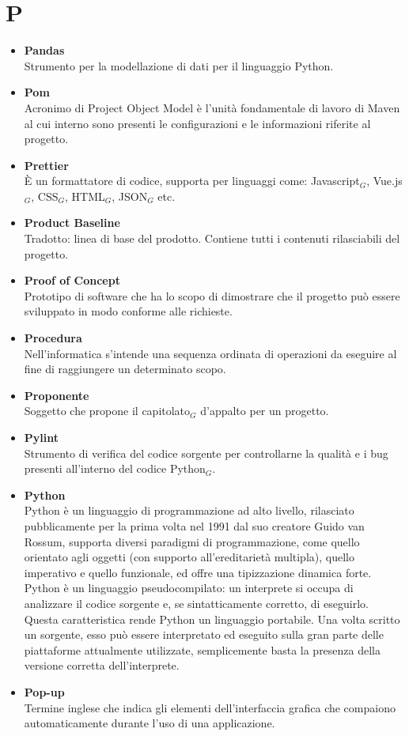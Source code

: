 \chapter{P} \label{P}
	\begin{itemize}
		\item \textbf{Pandas}\\
		Strumento per la modellazione di dati per il linguaggio Python.
		\item \textbf{Pom}\\
		Acronimo di Project Object Model è l'unità fondamentale di lavoro di Maven al cui interno sono presenti le configurazioni e le informazioni riferite al progetto.
		
		\item \textbf{Prettier} \\
		È un formattatore di codice, supporta per linguaggi come: Javascript$_G$, Vue.js$_G$, CSS$_G$, HTML$_G$, JSON$_G$ etc.

		\item \textbf{Product Baseline}\\
		Tradotto: linea di base del prodotto.
		Contiene tutti i contenuti rilasciabili del progetto.

		\item \textbf{Proof of Concept}\\
		Prototipo di software che ha lo scopo di dimostrare che il progetto può essere sviluppato in modo conforme alle richieste.

		\item \textbf{Procedura}\\
		Nell'informatica s'intende una sequenza ordinata di operazioni da eseguire al fine di raggiungere un determinato scopo.

		\item \textbf{Proponente}\\
		Soggetto che propone il capitolato$_G$ d'appalto per un progetto.

		\item \textbf{Pylint} \\
		Strumento di verifica del codice sorgente per controllarne la qualità e i bug presenti all'interno del codice Python$_G$.

		\item \textbf{Python}\\
		Python è un linguaggio di programmazione ad alto livello, rilasciato pubblicamente per la prima volta nel 1991 dal suo creatore Guido van Rossum, supporta diversi paradigmi di programmazione, come quello orientato agli oggetti (con supporto all'ereditarietà multipla), quello imperativo e quello funzionale, ed offre una tipizzazione dinamica forte.
		Python è un linguaggio pseudocompilato: un interprete si occupa di analizzare il codice sorgente e, se sintatticamente corretto, di eseguirlo. Questa caratteristica rende Python un linguaggio portabile. Una volta scritto un sorgente, esso può essere interpretato ed eseguito sulla gran parte delle piattaforme attualmente utilizzate, semplicemente basta la presenza della versione corretta dell’interprete.

		\item \textbf{Pop-up}\\
		Termine inglese che indica gli elementi dell'interfaccia grafica che compaiono automaticamente durante l'uso di una applicazione.
	\end{itemize}
